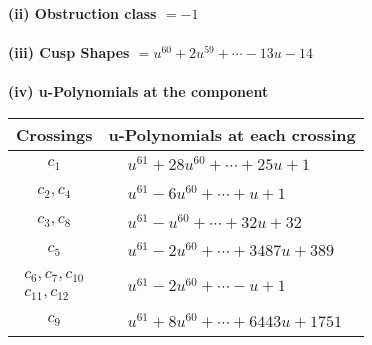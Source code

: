 \documentclass[1p]{elsarticle_modified}
\theoremstyle{definition}
\begin{document}
\flushleft \textbf{(ii) Obstruction class $= -1$}\\~\\
\flushleft \textbf{(iii) Cusp Shapes $= u^{60}+2 u^{59}+\cdots-13 u-14$}\\~\\
\newpage\renewcommand{\arraystretch}{1}
\flushleft \textbf{(iv) u-Polynomials at the component}\newline \\
\begin{tabular}{m{50pt}|m{274pt}}
Crossings & \hspace{64pt}u-Polynomials at each crossing \\
\hline $$\begin{aligned}c_{1}\end{aligned}$$&$\begin{aligned}
&u^{61}+28 u^{60}+\cdots+25 u+1
\end{aligned}$\\
\hline $$\begin{aligned}c_{2},c_{4}\end{aligned}$$&$\begin{aligned}
&u^{61}-6 u^{60}+\cdots+u+1
\end{aligned}$\\
\hline $$\begin{aligned}c_{3},c_{8}\end{aligned}$$&$\begin{aligned}
&u^{61}- u^{60}+\cdots+32 u+32
\end{aligned}$\\
\hline $$\begin{aligned}c_{5}\end{aligned}$$&$\begin{aligned}
&u^{61}-2 u^{60}+\cdots+3487 u+389
\end{aligned}$\\
\hline $$\begin{aligned}c_{6},c_{7},c_{10}\\c_{11},c_{12}\end{aligned}$$&$\begin{aligned}
&u^{61}-2 u^{60}+\cdots- u+1
\end{aligned}$\\
\hline $$\begin{aligned}c_{9}\end{aligned}$$&$\begin{aligned}
&u^{61}+8 u^{60}+\cdots+6443 u+1751
\end{aligned}$\\
\hline
\end{tabular}\\~\\
\end{document}
